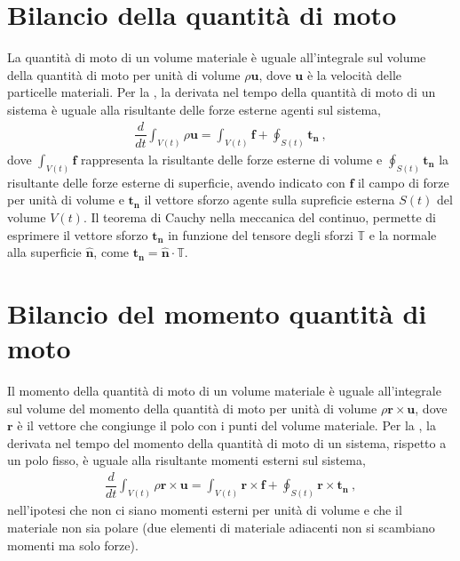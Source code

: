 \documentclass[letterpaper,10pt,italian]{jupyterBook}
\begin{document}
\section{Bilancio della quantità di moto}
\label{\detokenize{polimi/fluidmechanics-ita/template/capitoli/04_bilanci/04teoria:bilancio-della-quantita-di-moto}}
\sphinxAtStartPar
La quantità di moto di un volume materiale è uguale all’integrale sul
volume della quantità di moto per unità di volume \(\rho \mathbf{u}\), dove
\(\mathbf{u}\) è la velocità delle particelle materiali. Per la , la derivata nel tempo della
quantità di moto di un sistema è uguale alla risultante delle forze
esterne agenti sul sistema,
\begin{equation*}
\begin{split}\dfrac{d}{dt} \int_{V(t)} \rho \mathbf{u} = \int_{V(t)} \mathbf{f} + \oint_{S(t)} \mathbf{t_n} \ ,\end{split}
\end{equation*}
\sphinxAtStartPar
dove \(\int_{V(t)} \mathbf{f}\) rappresenta la risultante delle forze esterne
di volume e \(\oint_{S(t)} \mathbf{t_n}\) la risultante delle forze esterne di
superficie, avendo indicato con \(\mathbf{f}\) il campo di forze per unità di
volume e \(\mathbf{t_n}\) il vettore sforzo agente sulla supreficie esterna
\(S(t)\) del volume \(V(t)\). Il teorema di Cauchy nella meccanica del
continuo, permette di esprimere il vettore sforzo \(\mathbf{t_n}\) in funzione
del tensore degli sforzi \(\mathbb{T}\) e la normale alla superficie
\(\mathbf{\hat{n}}\), come \(\mathbf{t_n} = \mathbf{\hat{n}} \cdot \mathbb{T}\).


\section{Bilancio del momento quantità di moto}
\label{\detokenize{polimi/fluidmechanics-ita/template/capitoli/04_bilanci/04teoria:bilancio-del-momento-quantita-di-moto}}
\sphinxAtStartPar
Il momento della quantità di moto di un volume materiale è uguale
all’integrale sul volume del momento della quantità di moto per unità di
volume \(\rho \mathbf{r} \times \mathbf{u}\), dove \(\mathbf{r}\) è il vettore che
congiunge il polo con i punti del volume materiale. Per la , la derivata nel tempo del momento
della quantità di moto di un sistema, rispetto a un polo fisso, è uguale
alla risultante momenti esterni sul sistema,
\begin{equation*}
\begin{split}\dfrac{d}{dt} \int_{V(t)} \rho \mathbf{r} \times \mathbf{u} = \int_{V(t)} \mathbf{r} \times \mathbf{f} + \oint_{S(t)} \mathbf{r} \times \mathbf{t_n} \ ,\end{split}
\end{equation*}
\sphinxAtStartPar
nell’ipotesi che non ci siano momenti esterni per unità di volume e che
il materiale non sia polare (due elementi di materiale adiacenti non si
scambiano momenti ma solo forze).
\end{document}
